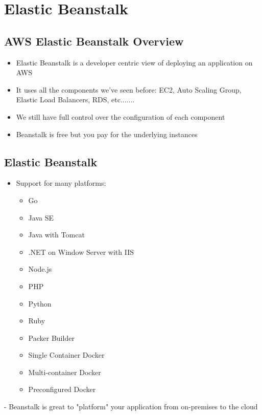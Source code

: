 \section{Elastic Beanstalk}

\subsection{AWS Elastic Beanstalk Overview}
\begin{itemize}
    \item Elastic Beanstalk is a developer centric view of deploying an application on AWS
    \item It uses all the components we've seen before: EC2, Auto Scaling Group, Elastic Load Balancers, RDS, etc.......
    \item We still have full control over the configuration of each component
    \item Beanstalk is free but you pay for the underlying instances
\end{itemize}

\subsection{Elastic Beanstalk}

\begin{itemize}
    \item Support for many platforms:
    \begin{itemize}
        \item Go
        \item Java SE
        \item Java with Tomcat
        \item .NET on Window Server with IIS
        \item Node.js
        \item PHP
        \item Python
        \item Ruby
        \item Packer Builder
        \item Single Container Docker
        \item Multi-container Docker
        \item Preconfigured Docker
    \end{itemize}
\end{itemize}

- Beanstalk is great to "platform" your application from on-premises to the cloud

